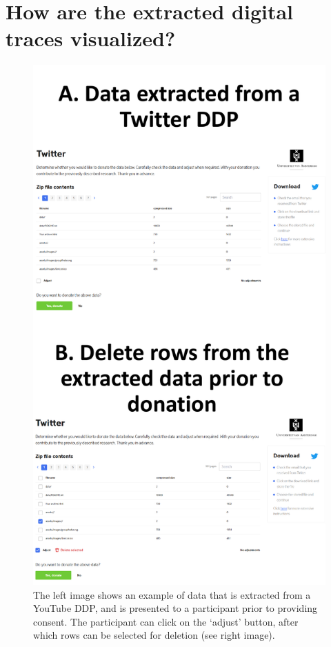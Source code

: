 \documentclass[
]{article}
\begin{document}
\hypertarget{how-are-the-extracted-digital-traces-visualized}{%
\section{How are the extracted digital traces
visualized?}\label{how-are-the-extracted-digital-traces-visualized}}

\begin{figure}
\centering
\includegraphics{Twitter_image.pdf}
\caption{The left image shows an example of data that is extracted from
a YouTube DDP, and is presented to a participant prior to providing
consent. The participant can click on the `adjust' button, after which
rows can be selected for deletion (see right image).
\label{fig:twitter}}
\end{figure}
\end{document}
